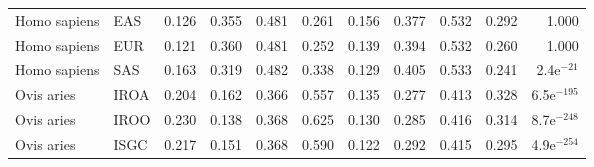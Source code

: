 \begin{center}
\begin{adjustbox}{width = 1\textwidth}
\begin{tabular}{llrrrrrrrrr}
        Homo sapiens &                       EAS &                              0.126 &                               0.355 &                 0.481 &                 0.261 &                              0.156 &                               0.377 &                 0.532 &                 0.292 &         1.000 \\
        Homo sapiens &                       EUR &                              0.121 &                               0.360 &                 0.481 &                 0.252 &                              0.139 &                               0.394 &                 0.532 &                 0.260 &         1.000 \\
        Homo sapiens &                       SAS &                              0.163 &                               0.319 &                 0.482 &                 0.338 &                              0.129 &                               0.405 &                 0.533 &                 0.241 &  2.4e$^{-21}$ \\
          Ovis aries &                      IROA &                              0.204 &                               0.162 &                 0.366 &                 0.557 &                              0.135 &                               0.277 &                 0.413 &                 0.328 & 6.5e$^{-195}$ \\
          Ovis aries &                      IROO &                              0.230 &                               0.138 &                 0.368 &                 0.625 &                              0.130 &                               0.285 &                 0.416 &                 0.314 & 8.7e$^{-248}$ \\
          Ovis aries &                      ISGC &                              0.217 &                               0.151 &                 0.368 &                 0.590 &                              0.122 &                               0.292 &                 0.415 &                 0.295 & 4.9e$^{-254}$ \\
\bottomrule
\end{tabular}
\end{adjustbox}
\end{center}
